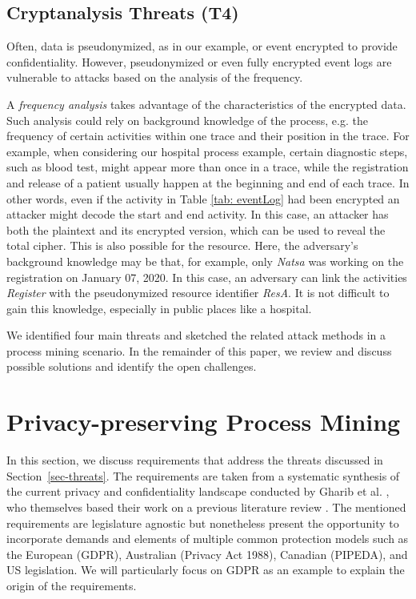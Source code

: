 \documentclass[manuscript]{acmart}
\begin{document}
\subsection{Cryptanalysis Threats (T4)}
Often, data is pseudonymized, as in our example, or event encrypted to provide confidentiality. However, pseudonymized or even fully encrypted event logs are vulnerable to attacks based on the analysis of the frequency.

A \textit{frequency analysis} takes advantage of the characteristics of the encrypted data. Such analysis could rely on background knowledge of the process, e.g. the frequency of certain activities within one trace and their position in the trace. For example, when considering our hospital process example, certain diagnostic steps, such as blood test, might appear more than once in a trace, while the registration and release of a patient usually happen at the beginning and end of each trace. In other words, even if the activity in Table \ref{tab: eventLog} had been encrypted an attacker might decode the start and end activity. In this case, an attacker has both the plaintext and its encrypted version, which can be used to reveal the total cipher. This is also possible for the resource. Here, the adversary's background knowledge may be that, for example, only \textit{Natsa} was working on the registration on January 07, 2020. In this case, an adversary can link the activities \textit{Register} with the pseudonymized resource identifier \textit{ResA}. It is not difficult to gain this knowledge, especially in public places like a hospital. 

We identified four main threats and sketched the related attack methods in a process mining scenario. In the remainder of this paper, we review and discuss possible solutions and identify the open challenges.

\section{Privacy-preserving Process Mining}
\label{sec-PPPM}
In this section, we discuss requirements that address the threats discussed in Section~\ref{sec-threats}. The requirements are taken from a systematic synthesis of the current privacy and confidentiality landscape conducted by Gharib et al. \cite{Gharib/CoPri2020}, who themselves based their work on a previous literature review \cite{Gharib/ER2017}. The mentioned requirements are legislature agnostic but nonetheless present the opportunity to incorporate demands and elements of multiple common protection models such as the European (GDPR), Australian (Privacy Act 1988), Canadian (PIPEDA), and US legislation. We will particularly focus on GDPR as an example to explain the origin of the requirements.
\end{document}

